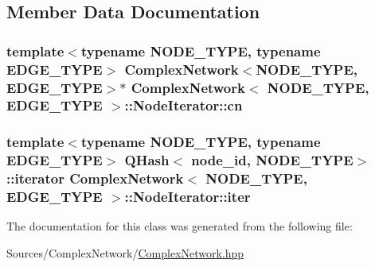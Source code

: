 \subsection{Member Data Documentation}
\hypertarget{class_complex_network_1_1_node_iterator_a128163df7d91ee8781ce99d61a47a6d0}{
\subsubsection[{cn}]{\setlength{\rightskip}{0pt plus 5cm}template$<$typename N\+O\+D\+E\+\_\+\+T\+Y\+P\+E, typename E\+D\+G\+E\+\_\+\+T\+Y\+P\+E$>$ {\bf Complex\+Network}$<$N\+O\+D\+E\+\_\+\+T\+Y\+P\+E, E\+D\+G\+E\+\_\+\+T\+Y\+P\+E$>$$\ast$ {\bf Complex\+Network}$<$ N\+O\+D\+E\+\_\+\+T\+Y\+P\+E, E\+D\+G\+E\+\_\+\+T\+Y\+P\+E $>$\+::Node\+Iterator\+::cn\hspace{0.3cm}{\ttfamily [private]}}}\label{class_complex_network_1_1_node_iterator_a128163df7d91ee8781ce99d61a47a6d0}
\hypertarget{class_complex_network_1_1_node_iterator_af7716e564d8333613a93bdd821ad6a97}{
\subsubsection[{iter}]{\setlength{\rightskip}{0pt plus 5cm}template$<$typename N\+O\+D\+E\+\_\+\+T\+Y\+P\+E, typename E\+D\+G\+E\+\_\+\+T\+Y\+P\+E$>$ Q\+Hash$<$ {\bf node\+\_\+id}, N\+O\+D\+E\+\_\+\+T\+Y\+P\+E$>$\+::iterator {\bf Complex\+Network}$<$ N\+O\+D\+E\+\_\+\+T\+Y\+P\+E, E\+D\+G\+E\+\_\+\+T\+Y\+P\+E $>$\+::Node\+Iterator\+::iter\hspace{0.3cm}{\ttfamily [private]}}}\label{class_complex_network_1_1_node_iterator_af7716e564d8333613a93bdd821ad6a97}


The documentation for this class was generated from the following file\+:\begin{DoxyCompactItemize}
\item 
Sources/\+Complex\+Network/\hyperlink{_complex_network_8hpp}{Complex\+Network.\+hpp}\end{DoxyCompactItemize}
